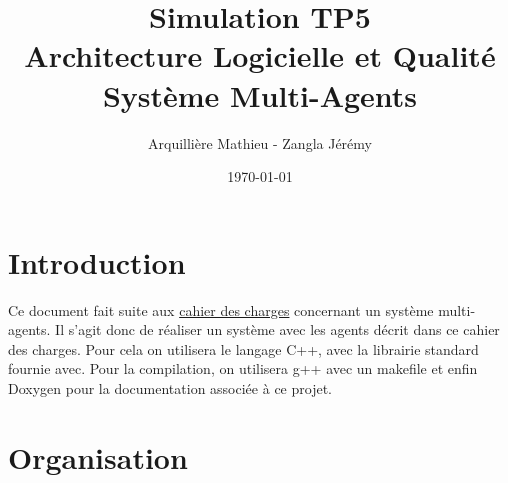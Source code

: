 \documentclass[a4paper, 12pt]{article}
\title{Simulation TP5\\Architecture Logicielle et Qualité\\Système Multi-Agents}
\author{Arquillière Mathieu - Zangla Jérémy}
\date{\today}
\newcommand{\changeurlcolor}[1]{\hypersetup{urlcolor=#1}}
\begin{document}
\begin{titlepage}
  \maketitle
\end{titlepage}

\tableofcontents
\listoffigures
\newpage



\section{Introduction}
Ce document fait suite aux \changeurlcolor{blue}\href{run:../CahierDesCharges/cahier.pdf}{cahier des charges} concernant
un système multi-agents. Il s'agit donc de réaliser un système avec les agents décrit dans ce cahier des charges.
Pour cela on utilisera le langage C++, avec la librairie standard fournie avec. Pour la compilation, on utilisera g++
avec un makefile et enfin Doxygen pour la documentation associée à ce projet.



\section{Organisation}
\end{document}
